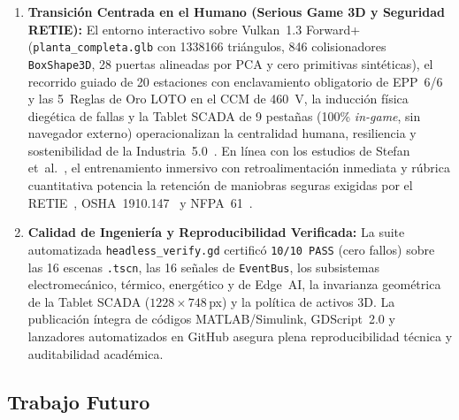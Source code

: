 \begin{enumerate}
  \item \textbf{Transici\'on Centrada en el Humano (Serious Game 3D y Seguridad
  RETIE):} El entorno interactivo sobre Vulkan~1.3 Forward+
  (\texttt{planta\_\allowbreak completa.glb} con \num{1338166} tri\'angulos,
  846 colisionadores \texttt{BoxShape3D}, 28 puertas alineadas por PCA y cero
  primitivas sint\'eticas), el recorrido guiado de 20 estaciones con
  enclavamiento obligatorio de EPP~6/6 y las 5~Reglas de Oro LOTO en el CCM de
  \qty{460}{\volt}, la inducci\'on f\'isica dieg\'etica de fallas y la Tablet
  SCADA de 9 pesta\~nas (100\% \emph{in-game}, sin navegador externo)
  operacionalizan la centralidad humana, resiliencia y sostenibilidad de la
  Industria~5.0~\cite{Breque2021,Xu2021}. En l\'inea con los estudios de
  Stefan et~al.~\cite{Stefan2023,Stefan2024}, el entrenamiento inmersivo con
  retroalimentaci\'on inmediata y r\'ubrica cuantitativa potencia la retenci\'on
  de maniobras seguras exigidas por el RETIE~\cite{RETIE2026},
  OSHA~1910.147~\cite{OSHA1910} y NFPA~61~\cite{NFPA61}.

  \item \textbf{Calidad de Ingenier\'ia y Reproducibilidad Verificada:} La
  suite automatizada \texttt{headless\_\allowbreak verify.gd} certific\'o
  \texttt{10/10 PASS} (cero fallos) sobre las 16 escenas \texttt{.tscn}, las 16
  se\~nales de \texttt{EventBus}, los subsistemas electromec\'anico, t\'ermico,
  energ\'etico y de Edge~AI, la invarianza geom\'etrica de la Tablet SCADA
  ($1228\times 748$\,px) y la pol\'itica de activos 3D. La publicaci\'on
  \'integra de c\'odigos MATLAB/Simulink, GDScript~2.0 y lanzadores
  automatizados en GitHub asegura plena reproducibilidad t\'ecnica y
  auditabilidad acad\'emica.
\end{enumerate}

\subsection{Trabajo Futuro}\label{subsec:trabajo_futuro}

